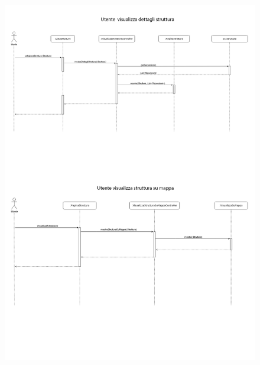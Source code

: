 \begin{figure}[h!]
    \includegraphics[width=\textwidth]{SequenceAnalisi/6.png}
\end{figure}
\pagebreak
